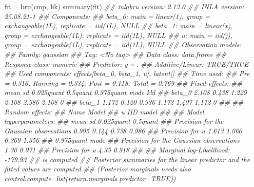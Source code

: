\documentclass[
  letterpaper,
  DIV=11,
  numbers=noendperiod]{scrartcl}
\newenvironment{Shaded}{\begin{snugshade}}{\end{snugshade}}
\newcommand{\DocumentationTok}[1]{\textcolor[rgb]{0.37,0.37,0.37}{\textit{#1}}}
\newcommand{\FunctionTok}[1]{\textcolor[rgb]{0.28,0.35,0.67}{#1}}
\newcommand{\NormalTok}[1]{\textcolor[rgb]{0.00,0.23,0.31}{#1}}
\newcommand{\OtherTok}[1]{\textcolor[rgb]{0.00,0.23,0.31}{#1}}
\begin{document}
\begin{Shaded}
\begin{Highlighting}[]
\NormalTok{fit }\OtherTok{=} \FunctionTok{bru}\NormalTok{(cmp, lik)}
\FunctionTok{summary}\NormalTok{(fit)}
\DocumentationTok{\#\# inlabru version: 2.13.0}
\DocumentationTok{\#\# INLA version: 25.08.21{-}1}
\DocumentationTok{\#\# Components:}
\DocumentationTok{\#\# beta\_0: main = linear(1), group = exchangeable(1L), replicate = iid(1L), NULL}
\DocumentationTok{\#\# beta\_1: main = linear(x), group = exchangeable(1L), replicate = iid(1L), NULL}
\DocumentationTok{\#\# u: main = iid(j), group = exchangeable(1L), replicate = iid(1L), NULL}
\DocumentationTok{\#\# Observation models:}
\DocumentationTok{\#\#   Family: \textquotesingle{}gaussian\textquotesingle{}}
\DocumentationTok{\#\#     Tag: \textless{}No tag\textgreater{}}
\DocumentationTok{\#\#     Data class: \textquotesingle{}data.frame\textquotesingle{}}
\DocumentationTok{\#\#     Response class: \textquotesingle{}numeric\textquotesingle{}}
\DocumentationTok{\#\#     Predictor: y \textasciitilde{} .}
\DocumentationTok{\#\#     Additive/Linear: TRUE/TRUE}
\DocumentationTok{\#\#     Used components: effects[beta\_0, beta\_1, u], latent[]}
\DocumentationTok{\#\# Time used:}
\DocumentationTok{\#\#     Pre = 0.316, Running = 0.334, Post = 0.118, Total = 0.769 }
\DocumentationTok{\#\# Fixed effects:}
\DocumentationTok{\#\#         mean    sd 0.025quant 0.5quant 0.975quant  mode kld}
\DocumentationTok{\#\# beta\_0 2.108 0.438      1.229    2.108      2.986 2.108   0}
\DocumentationTok{\#\# beta\_1 1.172 0.120      0.936    1.172      1.407 1.172   0}
\DocumentationTok{\#\# }
\DocumentationTok{\#\# Random effects:}
\DocumentationTok{\#\#   Name     Model}
\DocumentationTok{\#\#     u IID model}
\DocumentationTok{\#\# }
\DocumentationTok{\#\# Model hyperparameters:}
\DocumentationTok{\#\#                                          mean    sd 0.025quant 0.5quant}
\DocumentationTok{\#\# Precision for the Gaussian observations 0.995 0.144      0.738    0.986}
\DocumentationTok{\#\# Precision for u                         1.613 1.060      0.369    1.356}
\DocumentationTok{\#\#                                         0.975quant  mode}
\DocumentationTok{\#\# Precision for the Gaussian observations       1.30 0.971}
\DocumentationTok{\#\# Precision for u                               4.35 0.918}
\DocumentationTok{\#\# }
\DocumentationTok{\#\# Marginal log{-}Likelihood:  {-}179.93 }
\DocumentationTok{\#\#  is computed }
\DocumentationTok{\#\# Posterior summaries for the linear predictor and the fitted values are computed}
\DocumentationTok{\#\# (Posterior marginals needs also \textquotesingle{}control.compute=list(return.marginals.predictor=TRUE)\textquotesingle{})}
\end{Highlighting}
\end{Shaded}
\end{document}
